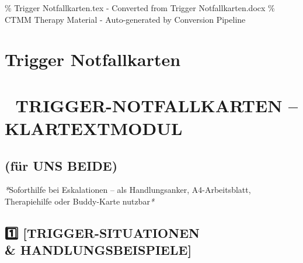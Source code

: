 \% Trigger Notfallkarten.tex - Converted from Trigger Notfallkarten.docx
\% CTMM Therapy Material - Auto-generated by Conversion Pipeline

\section{Trigger Notfallkarten}
\label{sec:trigger-notfallkarten}

\section{\textbf{🚨 TRIGGER-NOTFALLKARTEN -- KLARTEXTMODUL}}
\subsection{\textbf{(für UNS BEIDE)}}

\textcolor{ctmmBlue}{} \textit{*}Soforthilfe bei Eskalationen -- als Handlungsanker,
A4-Arbeitsblatt, Therapiehilfe oder Buddy-Karte nutzbar\textit{*}

\subsection{\textbf{1️⃣ [TRIGGER-SITUATIONEN \\& HANDLUNGSBEISPIELE]}}

